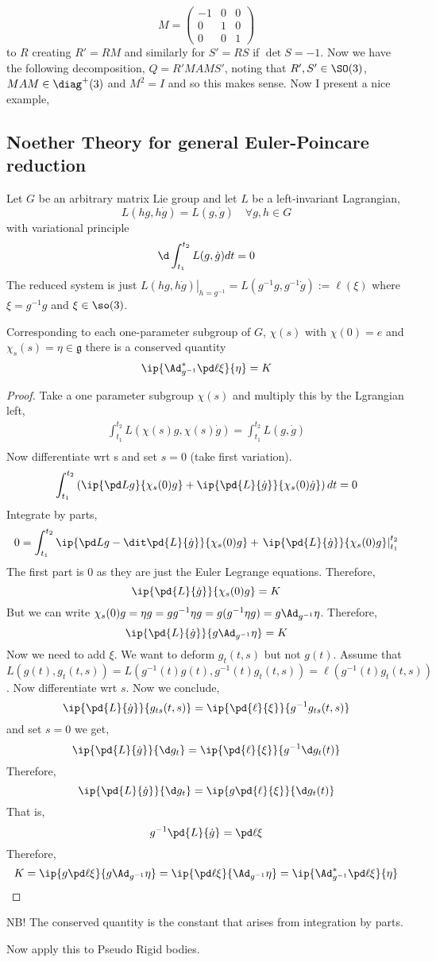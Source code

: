$$ M = \begin{pmatrix}
  -1 & 0 & 0 \\ 0 & 1 & 0 \\ 0 & 0 & 1
\end{pmatrix} $$
to $R$ creating $R' = RM$ and similarly for $S' = RS$ if $\det S = -1$. Now we have the following decomposition, $Q = R'MAMS'$, noting that $R', S' \in \SO(3)$, $MAM \in \diag^+(3)$ and $M^2 = I$ and so this makes sense. Now I present a nice example,



\subsection{Noether Theory for general Euler-Poincare reduction}
Let $G$ be an arbitrary matrix Lie group and let $L$ be a left-invariant Lagrangian,
$$ L(hg, h\dot g) = L(g, \dot g) \quad \forall g, h \in G$$
with variational principle
$$ \d \int_{t_1}^{t_2} L(g, \dot g)dt = 0 $$
The reduced system is just $\left.L(hg, h\dot g)\right|_{h = g^{-1}} = L(g^{-1}g, g^{-1}\dot g) := \ell(\xi)$ where $\xi = g^{-1}g$ and $\xi \in \so(3)$.
\begin{nthm}
  Corresponding to each one-parameter subgroup of $G$, $\chi(s)$ with $\chi(0) = e$ and $\chi_s (s) = \eta \in \mathfrak{g}$ there is a conserved quantity
  $$ \ip{\Ad^*_{g^{-1}} \pd \ell \xi}{\eta} = K $$
\end{nthm}
\begin{proof}
  Take a one parameter subgroup $\chi(s)$ and multiply this by the Lgrangian left,
  \begin{align*}
    \int_{t_1}^{t_2} L(\chi(s)g, \chi(s)\dot g) = \int_{t_1}^{t_2} L(g, \dot g) \\
  \end{align*}
  Now differentiate wrt s and set $s = 0$ (take first variation).
  $$ \int_{t_1}^{t_2} \left(\ip{\pd L g}{\chi_s(0)g} + \ip{\pd{L}{\dot g}}{\chi_s(0)\dot g}\right)dt = 0 $$
  Integrate by parts,
  $$ 0 = \int_{t_1}^{t_2} \ip{\pd L g - \dit \pd{L}{\dot g}}{\chi_s(0)g} + \left.\ip{\pd{L}{\dot g}}{\chi_s(0)g}\right|_{t_1}^{t_2} $$
  The first part is $0$ as they are just the Euler Legrange equations. Therefore,
  $$ \ip{\pd{L}{\dot g}}{\chi_s(0)g} = K $$
  But we can write $\chi_s(0)g = \eta g = gg^{-1}\eta g = g(g^{-1}\eta g) = g\Ad_{g^{-1}}\eta$. Therefore,
  $$ \ip{\pd{L}{\dot g}}{g\Ad_{g^{-1}}\eta} = K $$
  Now we need to add $\xi$. We want to deform $g_t(t, s)$ but not $g(t)$. Assume that $L(g(t), g_t(t, s)) = L(g^{-1}(t)g(t),  g^{-1}(t)g_t(t, s)) = \ell(g^{-1}(t)g_t(t,s))$. Now differentiate wrt $s$. Now we conclude,
  $$ \ip{\pd{L}{\dot g}}{g_{ts}(t, s)} = \ip{\pd{\ell}{\xi}}{g^{-1}g_{ts}(t, s)} $$
   and set $s = 0$ we get,
   $$ \ip{\pd{L}{\dot g}}{\d g_{t}} = \ip{\pd{\ell}{\xi}}{g^{-1}\d g_{t}(t)} $$
   Therefore,
   $$ \ip{\pd{L}{\dot g}}{\d g_{t}} = \ip{g\pd{\ell}{\xi}}{\d g_{t}(t)} $$
   That is,
   $$ g^{-1}\pd{L}{\dot g} = \pd \ell \xi $$
   Therefore,
   $$ K = \ip{g\pd \ell \xi}{g\Ad_{g^{-1}}\eta} = \ip{\pd \ell \xi}{\Ad_{g^{-1}}\eta} = \ip{\Ad^*_{g^{-1}}\pd \ell \xi}{\eta} $$
\end{proof}
NB! The conserved quantity is the constant that arises from integration by parts.

\begin{eg}
  Now apply this to Pseudo Rigid bodies.
\end{eg}
